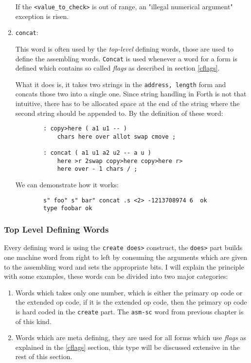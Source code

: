 \begin{enumerate}
        If the \texttt{<value\_to\_check>} is out of range, an 
        "illegal numerical argument" exception is risen.

        \item \texttt{concat}:

        This word is often used by the \textit{top-level} defining words, those
        are used to define the assembling words. \texttt{Concat} is used
        whenever a word for a form is defined which contains so called
        \textit{flags} as described in section \ref{cflags}.

        What it does is, it takes two strings in the \texttt{address, length}
        form and concats those two into a single one. Since string handling in
        Forth is not that intuitive, there has to be allocated space at the end
        of the string where the second string should be appended to. By the
        definition of these word:

        \begin{verbatim}
        : copy>here ( a1 u1 -- )
            chars here over allot swap cmove ;

        : concat ( a1 u1 a2 u2 -- a u )
            here >r 2swap copy>here copy>here r>
            here over - 1 chars / ;
        \end{verbatim}

        We can demonstrate how it works:

        \begin{verbatim}
        s" foo" s" bar" concat .s <2> -1213708974 6  ok
        type foobar ok
        \end{verbatim}

    \end{enumerate}

    \subsubsection{Top Level Defining Words}

    Every defining word is using the \texttt{create does>} construct, the
    \texttt{does>} part builds one machine word from right to left by consuming
    the arguments which are given to the assembling word and sets the
    appropriate bits.
    I will explain the principle with some examples, these words can be divided
    into two major categories:

    \begin{enumerate}
    \item Words which takes only one number, which is either the primary
    op code or the extended op code, if it is the extended op code, then the
    primary op code is hard coded in the \texttt{create} part. 
    The \texttt{asm-sc} word from previous chapter is of this kind.

    \item Words which are meta defining, they are used for all forms which
    use \textit{flags} as explained in the \ref{cflags} section, this type 
    will be discussed extensive in the rest of this section.
    \end{enumerate}

